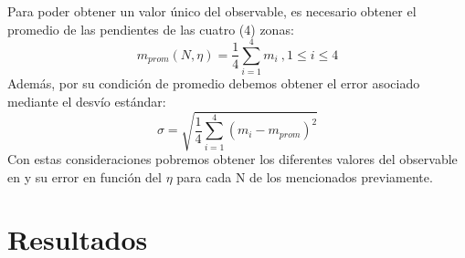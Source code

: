 \documentclass[11pt]{article}
\begin{document}
            Para poder obtener un valor único del observable, es necesario obtener el promedio de las pendientes de las cuatro (4) zonas:
            \begin{equation}
                m_{prom}(N,\eta) = \frac{1}{4} \sum_{i=1}^{4} m_i \ , 1 \leq i \leq 4
            \end{equation}
            Además, por su condición de promedio debemos obtener el error asociado mediante el desvío estándar:
            \begin{equation}
                \sigma = \sqrt{\frac{1}{4} \sum_{i=1}^{4} (m_i - m_{prom})^2}
            \end{equation}
            Con estas consideraciones pobremos obtener los diferentes valores del observable en y su error en función del $\eta$
            para cada N de los mencionados previamente.

    \newpage

    \section{Resultados}
\end{document}

